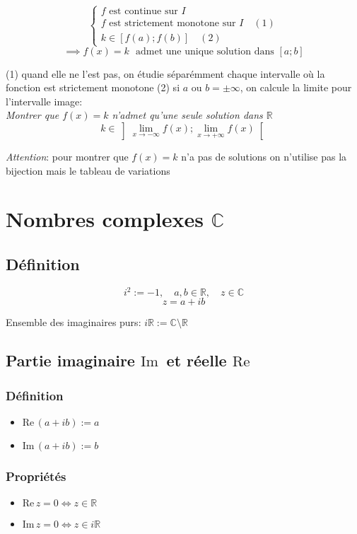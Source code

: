 \documentclass{article}
\newcommand{\im}{\text{Im}\,}
\newcommand{\re}{\text{Re}\,}
\newcommand{\R}{\mathds{R}}
\newcommand{\C}{\mathds{C}}
\newcommand{\oo}{\infty}
\newcommand{\liminfty}{\lim_{x\to+\oo}}
\newcommand{\limminfty}{\lim_{x\to-\oo}}
\begin{document}
$$
\begin{cases}
\text{$f$ est continue sur $I$}\\
\text{$f$ est strictement monotone sur $I$}\quad(1)\\
k \in [f(a); f(b)]\quad(2)
\end{cases}$$
$$
\implies f(x) = k\:\:\:\text{admet une unique solution dans $[a; b]$}
$$

\noindent(1) quand elle ne l'est pas, on étudie séparémment chaque intervalle où la fonction est strictement monotone
\vspace{2pt}
\noindent(2) si $a$ ou $b = \pm\oo$, on calcule la limite pour l'intervalle image:\\
\textit{Montrer que $f(x) = k$ n'admet qu'une seule solution dans $\R$}
\[k \in \left]\limminfty f(x); \liminfty f(x)\right[\]

\vspace{20pt}

\noindent\textit{Attention}: pour montrer que $f(x) = k$ n'a pas de solutions on n'utilise pas la bijection mais le tableau de variations

\newpage\section{Nombres complexes $\mathds{C}$}
\subsection{Définition}
\[i^2 := -1,\quad a, b \in \R,\quad z\in\mathds{C}\]
\[z = a + ib\]

Ensemble des imaginaires purs: $i\R := \C \setminus \R$

\subsection{Partie imaginaire $\im$ et réelle $\re$}
\subsubsection{Définition}
\begin{itemize}
    \item $\re(a + ib) := a$
    \item $\im(a + ib) := b$
\end{itemize}
\subsubsection{Propriétés}
\begin{itemize}
    \item $\re z = 0 \iff z \in \R$
    \item $\im z = 0 \iff z \in i\R$
\end{itemize}
\end{document}
